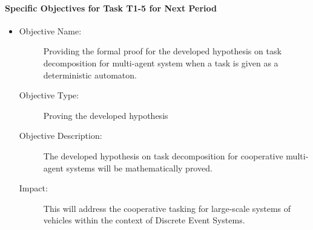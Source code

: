 \paragraph{Specific Objectives for Task T1-5 for Next Period}

\begin{itemize}
  \item
        {
        \begin{description}
          \item[Objective Name:]  Providing the formal proof for the developed hypothesis on task decomposition for multi-agent system
when a task is given as a deterministic automaton.
          \item[Objective Type:]  Proving the developed hypothesis
          \item[Objective Description:] The developed hypothesis on task decomposition for cooperative multi-agent systems will be mathematically proved.
          \item[Impact: ] This will address the cooperative tasking for large-scale systems of vehicles within the context of Discrete Event Systems.
            \end{description}
        }
\end{itemize}

